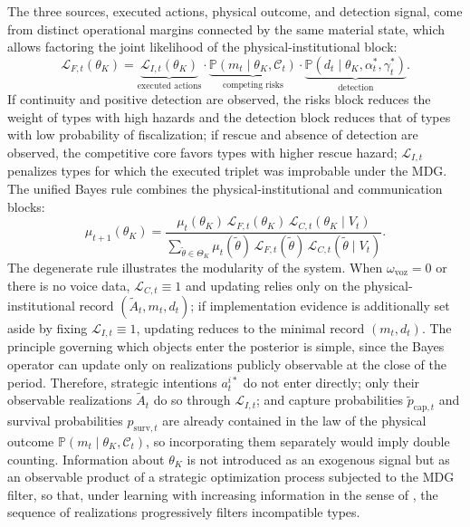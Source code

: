 \documentclass[pdflatex,sn-mathphys-ay]{sn-jnl}
\theoremstyle{plain}
\theoremstyle{definition}
\newcommand{\Prob}{\mathbb{P}}
\newcommand{\ThetaK}{\Theta_K}
\newcommand{\1}{\mathbf{1}}
\begin{document}
The three sources, executed actions, physical outcome, and detection signal, come from distinct operational margins connected by the same material state, which allows factoring the joint likelihood of the physical-institutional block:
\begin{equation}
\mathcal{L}_{F,t}(\theta_K)=\underbrace{\mathcal{L}_{I,t}(\theta_K)}_{\text{executed actions}}\cdot\underbrace{\Prob(m_t\mid\theta_K,\mathcal{C}_t)}_{\text{competing risks}}\cdot\underbrace{\Prob(d_t\mid\theta_K,\alpha_t^\ast,\gamma_t^\ast)}_{\text{detection}}.
\label{eq:LF-joint}
\end{equation}
If continuity and positive detection are observed, the risks block reduces the weight of types with high hazards and the detection block reduces that of types with low probability of fiscalization; if rescue and absence of detection are observed, the competitive core favors types with higher rescue hazard; $\mathcal{L}_{I,t}$ penalizes types for which the executed triplet was improbable under the MDG. The unified Bayes rule combines the physical-institutional and communication blocks:
\begin{equation}
\mu_{t+1}(\theta_K)=\frac{\mu_t(\theta_K)\,\mathcal{L}_{F,t}(\theta_K)\,\mathcal{L}_{C,t}(\theta_K\mid V_t)}{\sum_{\tilde\theta\in\ThetaK}\mu_t(\tilde\theta)\,\mathcal{L}_{F,t}(\tilde\theta)\,\mathcal{L}_{C,t}(\tilde\theta\mid V_t)}.
\label{eq:bayes-update}
\end{equation}
The degenerate rule illustrates the modularity of the system. When $\omega_{\mathrm{voz}}=0$ or there is no voice data, $\mathcal{L}_{C,t}\equiv 1$ and updating relies only on the physical-institutional record $(\tilde{A}_t,m_t,d_t)$; if implementation evidence is additionally set aside by fixing $\mathcal{L}_{I,t}\equiv 1$, updating reduces to the minimal record $(m_t,d_t)$. The principle governing which objects enter the posterior is simple, since the Bayes operator can update only on realizations publicly observable at the close of the period. Therefore, strategic intentions $a_t^{i\ast}$ do not enter directly; only their observable realizations $\tilde{A}_t$ do so through $\mathcal{L}_{I,t}$; and capture probabilities $\tilde{p}_{\mathrm{cap},t}$ and survival probabilities $p_{\mathrm{surv},t}$ are already contained in the law of the physical outcome $\Prob(m_t\mid\theta_K,\mathcal{C}_t)$, so incorporating them separately would imply double counting. Information about $\theta_K$ is not introduced as an exogenous signal but as an observable product of a strategic optimization process subjected to the MDG filter, so that, under learning with increasing information in the sense of \citet{BlackwellDubins1962}, the sequence of realizations progressively filters incompatible types.
\end{document}
